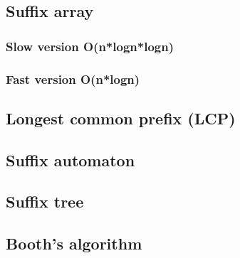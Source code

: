 \subsection{Suffix array}

\subsubsection{Slow version O(n*logn*logn)}


\subsubsection{Fast version O(n*logn)}


\subsection{Longest common prefix (LCP)}


\subsection{Suffix automaton}


\subsection{Suffix tree}


\subsection{Booth's algorithm}


